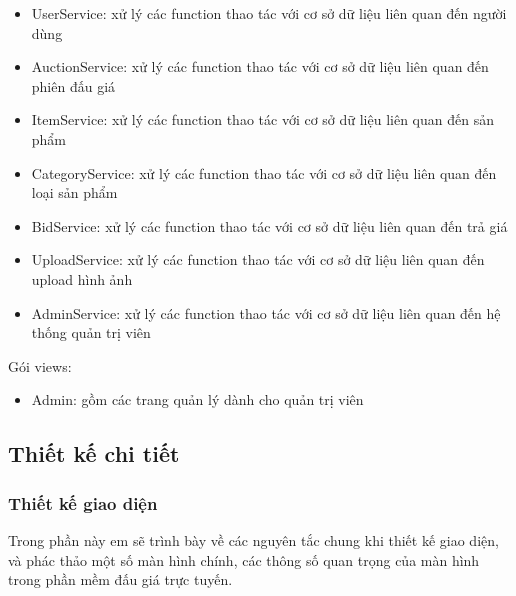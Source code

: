 \documentclass{article}
\begin{document}
\begin{itemize}
    \item UserService: xử lý các function thao tác với cơ sở dữ liệu liên quan đến người dùng
    \item AuctionService: xử lý các function thao tác với cơ sở dữ liệu liên quan đến phiên đấu giá
    \item ItemService: xử lý các function thao tác với cơ sở dữ liệu liên quan đến sản phẩm
    \item CategoryService: xử lý các function thao tác với cơ sở dữ liệu liên quan đến loại sản phẩm
    \item BidService: xử lý các function thao tác với cơ sở dữ liệu liên quan đến trả giá
    \item UploadService: xử lý các function thao tác với cơ sở dữ liệu liên quan đến upload hình ảnh
    \item AdminService: xử lý các function thao tác với cơ sở dữ liệu liên quan đến hệ thống quản trị viên
\end{itemize}
Gói views: 
\begin{itemize}
    \item Admin: gồm các trang quản lý dành cho quản trị viên
\end{itemize}
\subsection{Thiết kế chi tiết}
\subsubsection{Thiết kế giao diện}
Trong phần này em sẽ trình bày về các nguyên tắc chung khi thiết kế giao diện, và phác thảo một số màn hình chính, các thông số quan trọng của màn hình trong phần mềm đấu giá trực tuyến.
\end{document}
